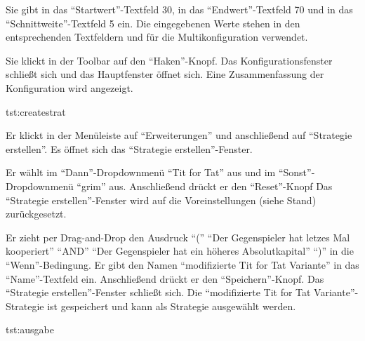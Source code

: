 \documentclass[parskip=full,11pt]{scrartcl}
\begin{document}
{Sie gibt in das \enquote{Startwert}-Textfeld 30, in das \enquote{Endwert}-Textfeld 70 und in das \enquote{Schnittweite}-Textfeld 5 ein.}
{Die eingegebenen Werte stehen in den entsprechenden Textfeldern und für die Multikonfiguration verwendet.}

{Sie klickt in der Toolbar auf den \enquote{Haken}-Knopf.}
{Das Konfigurationsfenster schließt sich und das Hauptfenster öffnet sich. Eine Zusammenfassung der Konfiguration wird angezeigt.}

{tst:createstrat}

{Er klickt in der Menüleiste auf \enquote{Erweiterungen} und anschließend auf \enquote{Strategie erstellen}.}
{Es öffnet sich das \enquote{Strategie erstellen}-Fenster.}

{Er wählt im \enquote{Dann}-Dropdownmenü \enquote{Tit for Tat} aus und im \enquote{Sonst}-Dropdownmenü \enquote{grim} aus. Anschließend drückt er den \enquote{Reset}-Knopf}
{Das \enquote{Strategie erstellen}-Fenster wird auf die Voreinstellungen (siehe Stand) zurückgesetzt.}

{Er zieht per Drag-and-Drop den Ausdruck \enquote{(} \enquote{Der Gegenspieler hat letzes Mal kooperiert} \enquote{AND} \enquote{Der Gegenspieler hat ein höheres Absolutkapital} \enquote{)} in die \enquote{Wenn}-Bedingung. Er gibt den Namen \enquote{modifizierte Tit for Tat Variante} in das \enquote{Name}-Textfeld ein. Anschließend drückt er den \enquote{Speichern}-Knopf.}
{Das \enquote{Strategie erstellen}-Fenster schließt sich. Die \enquote{modifizierte Tit for Tat Variante}-Strategie ist gespeichert und kann als Strategie ausgewählt werden.}

{tst:ausgabe}
\end{document}
